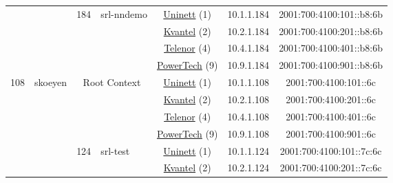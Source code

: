\begin{small}
\begin{center}
\begin{longtable}{|c|c|c|c|c|c|c|c|}
  &  & \multirow{4}{*}{\tiny{184}} & \multicolumn{1}{|l|}{\multirow{4}{*}{\tiny{srl-nndemo}}} & \multicolumn{2}{|c|}{\tiny{\href{https://www.uninett.no}{Uninett} (1)}} & \tiny{10.1.1.184} & \tiny{2001:700:4100:101::b8:6b} \\* \cline{5-5}\cline{6-6}\cline{7-7}\cline{8-8}
  &  &  &  & \multicolumn{2}{|c|}{\tiny{\href{http://kvantel.no}{Kvantel} (2)}} & \tiny{10.2.1.184} & \tiny{2001:700:4100:201::b8:6b} \\* \cline{5-5}\cline{6-6}\cline{7-7}\cline{8-8}
  &  &  &  & \multicolumn{2}{|c|}{\tiny{\href{https://www.telenor.no}{Telenor} (4)}} & \tiny{10.4.1.184} & \tiny{2001:700:4100:401::b8:6b} \\* \cline{5-5}\cline{6-6}\cline{7-7}\cline{8-8}
  &  &  &  & \multicolumn{2}{|c|}{\tiny{\href{http://www.powertech.no}{PowerTech} (9)}} & \tiny{10.9.1.184} & \tiny{2001:700:4100:901::b8:6b} \\ \hline
 \multirow{20}{*}{\tiny{108}} & \multicolumn{1}{|l|}{\multirow{20}{*}{\tiny{skoeyen}}} & \multicolumn{2}{|c|}{\multirow{4}{*}{\tiny{Root Context}}} & \multicolumn{2}{|c|}{\tiny{\href{https://www.uninett.no}{Uninett} (1)}} & \tiny{10.1.1.108} & \tiny{2001:700:4100:101::6c} \\* \cline{5-5}\cline{6-6}\cline{7-7}\cline{8-8}
  &  & \multicolumn{2}{|c|}{} & \multicolumn{2}{|c|}{\tiny{\href{http://kvantel.no}{Kvantel} (2)}} & \tiny{10.2.1.108} & \tiny{2001:700:4100:201::6c} \\* \cline{5-5}\cline{6-6}\cline{7-7}\cline{8-8}
  &  & \multicolumn{2}{|c|}{} & \multicolumn{2}{|c|}{\tiny{\href{https://www.telenor.no}{Telenor} (4)}} & \tiny{10.4.1.108} & \tiny{2001:700:4100:401::6c} \\* \cline{5-5}\cline{6-6}\cline{7-7}\cline{8-8}
  &  & \multicolumn{2}{|c|}{} & \multicolumn{2}{|c|}{\tiny{\href{http://www.powertech.no}{PowerTech} (9)}} & \tiny{10.9.1.108} & \tiny{2001:700:4100:901::6c} \\* \cline{3-3}\cline{4-4}\cline{5-5}\cline{6-6}\cline{7-7}\cline{8-8}
  &  & \multirow{4}{*}{\tiny{124}} & \multicolumn{1}{|l|}{\multirow{4}{*}{\tiny{srl-test}}} & \multicolumn{2}{|c|}{\tiny{\href{https://www.uninett.no}{Uninett} (1)}} & \tiny{10.1.1.124} & \tiny{2001:700:4100:101::7c:6c} \\* \cline{5-5}\cline{6-6}\cline{7-7}\cline{8-8}
  &  &  &  & \multicolumn{2}{|c|}{\tiny{\href{http://kvantel.no}{Kvantel} (2)}} & \tiny{10.2.1.124} & \tiny{2001:700:4100:201::7c:6c} \\* \cline{5-5}\cline{6-6}\cline{7-7}\cline{8-8}

\end{longtable}
\end{center}
\end{small}
